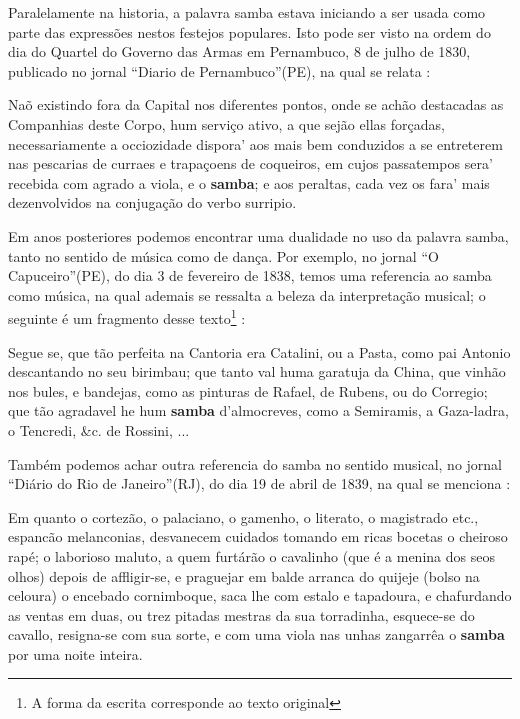Paralelamente na historia, a palavra samba estava iniciando a ser usada como parte
das expressões nestos festejos populares. 
Isto pode ser visto na ordem do dia do Quartel do Governo das Armas em
Pernambuco, 8 de julho de 1830, publicado no jornal ``Diario de Pernambuco''(PE), 
na qual se  relata \cite[pp. 3]{sambadiariodepernanbuco}:
\begin{citando}%
Naõ existindo fora da Capital nos diferentes pontos,
onde se achão destacadas as Companhias deste Corpo, 
hum serviço ativo, a que sejão ellas forçadas, 
necessariamente a occiozidade dispora' 
aos mais bem conduzidos a se entreterem nas pescarias de curraes e trapaçoens de coqueiros,
em cujos passatempos sera' recebida com agrado a viola, e o \textbf{samba};
e aos peraltas, cada vez os fara' mais dezenvolvidos na conjugação do verbo surripio.
\end{citando}
Em anos posteriores podemos encontrar uma dualidade no uso da palavra samba, 
tanto no sentido de música como de dança. Por exemplo, no jornal ``O Capuceiro''(PE),
do dia 3 de fevereiro de 1838, temos uma referencia ao samba como música,
na qual ademais se ressalta a beleza da interpretação musical;
o seguinte é um fragmento desse texto\footnote{\label{footort2}A forma da escrita corresponde ao texto original} \cite[pp. 1]{sambaperiodicoocapuceiro}:
\begin{citando}%
Segue se, que tão perfeita na Cantoria era Catalini, ou a Pasta,
como pai Antonio descantando no seu birimbau; que tanto val huma garatuja da China,
que vinhão nos bules, e bandejas,
como as pinturas de Rafael, de Rubens, ou do Corregio;
que tão agradavel he hum \textbf{samba} d'almocreves, como a Semiramis,
a Gaza-ladra, o Tencredi, \&c. de Rossini, ...
\end{citando}
Também podemos achar outra referencia do samba no sentido musical, no jornal ``Diário do Rio de Janeiro''(RJ),
do dia 19 de abril de 1839, na qual se menciona \cite[pp. 1]{sambadiariorj1}:
\begin{citando}%
Em quanto o cortezão, o palaciano, o gamenho, o literato, o magistrado etc., 
espancão melanconias, desvanecem cuidados tomando em ricas bocetas o cheiroso rapé;
o laborioso maluto, a quem furtárão o cavalinho (que é a menina dos seos olhos)
depois de affligir-se, e praguejar em balde arranca do quijeje (bolso na celoura)
o encebado cornimboque, saca lhe com estalo e tapadoura, e chafurdando as ventas em duas,
ou trez pitadas mestras da sua torradinha, esquece-se do cavallo, resigna-se com sua sorte,
e com uma viola nas unhas zangarrêa o \textbf{samba} por uma noite inteira.
\end{citando}

